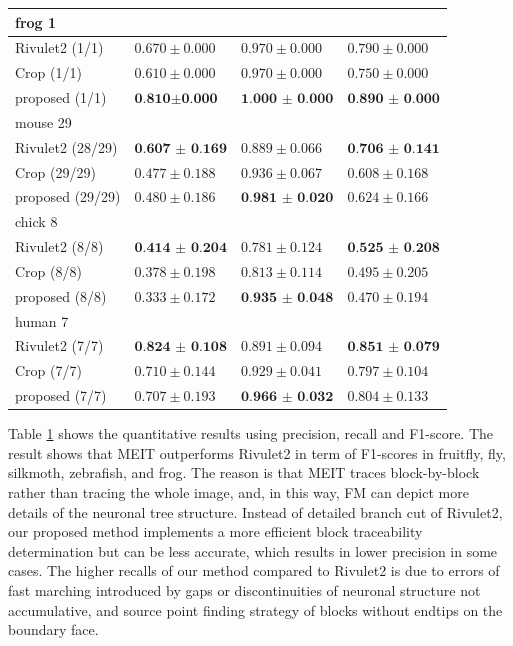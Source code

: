 \documentclass[conference]{IEEEtran}
\begin{document}
\begin{table}[htbp]
\begin{center}
\begin{tabular}{|l|l|l|l|}
\hline
frog 1 &\multicolumn{3}{l|}{}\\
\hline
Rivulet2 (1/1)    & $0.670\pm0.000$   & $0.970\pm0.000$  & $0.790\pm0.000$\\
Crop (1/1) & $0.610\pm0.000$   & $0.970\pm0.000$  &  $0.750\pm0.000$\\
proposed (1/1) & $\textbf{0.810}$$\pm$$\textbf{0.000}$   & $\textbf{1.000}$ $\boldsymbol{\pm}$ $\textbf{0.000}$  &  $\textbf{0.890}$ $\boldsymbol{\pm}$ $\textbf{0.000}$\\ 
\hline
mouse 29 &\multicolumn{3}{l|}{}\\
\hline
Rivulet2 (28/29)    & $\textbf{0.607}$ $\boldsymbol{\pm}$ $\textbf{0.169}$   & $0.889 \pm 0.066$  & $\textbf{0.706}$ $\boldsymbol{\pm}$ $\textbf{0.141}$\\
Crop (29/29) & $0.477\pm0.188$   & $0.936\pm0.067$  &  $0.608\pm0.168$\\
proposed (29/29) & $0.480\pm0.186$   & $\textbf{0.981}$ $\boldsymbol{\pm}$ $\textbf{0.020}$  &  $0.624\pm0.166$\\ 
\hline
chick 8 &\multicolumn{3}{l|}{}\\ 
\hline
Rivulet2 (8/8)    & $\textbf{0.414}$ $\boldsymbol{\pm}$ $\textbf{0.204}$   & $0.781\pm0.124$  & $\textbf{0.525}$ $\boldsymbol{\pm}$ $\textbf{0.208}$\\
Crop (8/8) & $0.378\pm0.198$   & $0.813\pm0.114$  &  $0.495\pm0.205$\\
proposed (8/8) & $0.333\pm0.172$   & $\textbf{0.935}$ $\boldsymbol{\pm}$ $\textbf{0.048}$  &  $0.470\pm0.194$\\ 
\hline
human 7 &\multicolumn{3}{l|}{}\\ 
\hline
Rivulet2 (7/7)    & $\textbf{0.824}$ $\boldsymbol{\pm}$ $\textbf{0.108}$   & $0.891\pm0.094$  & $\textbf{0.851}$ $\boldsymbol{\pm}$ $\textbf{0.079}$\\
Crop (7/7) & $0.710\pm0.144$   & $0.929\pm0.041$  &  $0.797\pm0.104$\\
proposed (7/7) & $0.707\pm0.193$   & $\textbf{0.966}$ $\boldsymbol{\pm}$ $\textbf{0.032}$  &  $0.804\pm0.133$\\
\hline
\end{tabular}
\label{tab:quant}
\end{center}
\end{table}



Table \ref{tab:quant} shows the quantitative results using precision, recall and F1-score. The result shows that MEIT outperforms Rivulet2 in term of F1-scores in fruitfly, fly, silkmoth, zebrafish, and frog. The reason is that MEIT traces block-by-block rather than tracing the whole image, and, in this way, FM can depict more details of the neuronal tree structure. Instead of detailed branch cut of Rivulet2, our proposed method implements a more efficient block traceability determination but can be less accurate, which results in lower precision in some cases. The higher recalls of our method compared to Rivulet2 is due to errors of fast marching introduced by gaps or discontinuities of neuronal structure not accumulative, and source point finding strategy of blocks without endtips on the boundary face.             
\end{document}
